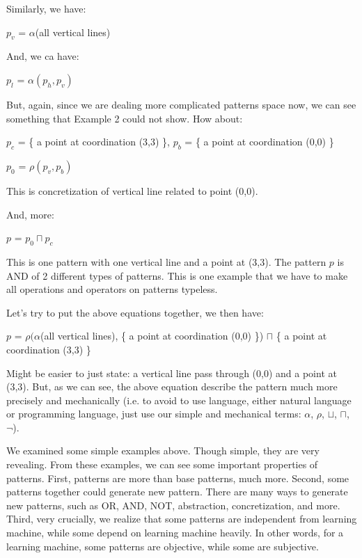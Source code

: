 Similarly, we have:  
\begin{center}
$p_v$ = $\alpha$(all vertical lines) 
\end{center}  

And, we ca have: 
\begin{center}
$p_l$ = $\alpha (p_h, p_v)$
\end{center}

But, again, since we are dealing more complicated patterns space now, we can see something that Example 2 could not show. How about: 
\begin{center}
$p_c$ = \{ a point at coordination (3,3) \},  $p_b$ = \{ a point at coordination (0,0) \}
\end{center} 

\begin{center}
$p_0$ = $\rho(p_v, p_b)$
\end{center} 
This is concretization of vertical line related to point (0,0). 

And, more:
\begin{center}
$p$ = $p_0 \sqcap p_c$
\end{center} 
This is one pattern with one vertical line and a point at (3,3). The pattern $p$ is AND of 2 different types of patterns. This is one example that we have to make all operations and operators on patterns typeless.

Let's try to put the above equations together, we then have:
\begin{center}
$p$ = $\rho(\alpha$(all vertical lines), \{ a point at coordination (0,0) \}) $\sqcap$ \{ a point at coordination (3,3) \}
\end{center}

Might be easier to just state: a vertical line pass through (0,0) and a point at (3,3). But, as we can see, the above equation describe the pattern much more precisely and mechanically (i.e. to avoid to use language, either natural language or programming language, just use our simple and mechanical terms: $\alpha$, $\rho$, $\sqcup$, $\sqcap$, $\neg$).  


We examined some simple examples above. Though simple, they are very revealing. From these examples, we can see some important properties of patterns. First, patterns are more than base patterns, much more. Second, some patterns together could generate new pattern. There are many ways to generate new patterns, such as OR, AND, NOT, abstraction, concretization, and more. Third, very crucially, we realize that some patterns are independent from learning machine, while some depend on learning machine heavily. In other words, for a learning machine, some patterns are objective, while some are subjective. 
\bigskip


